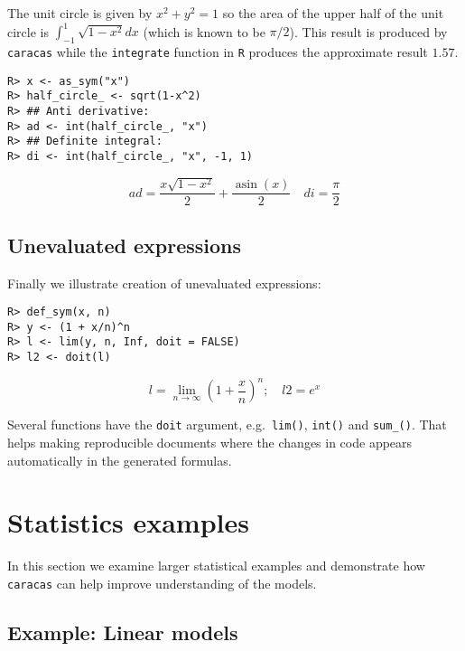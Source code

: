 The unit circle is given by \(x^2 + y^2 = 1\) so the area of the upper
half of the unit circle is \(\int_{-1}^1 \sqrt{1-x^2}dx\) (which is
known to be \(\pi/2\)). This result is produced by \texttt{caracas} while the
\texttt{integrate} function in \texttt{R} produces the approximate result \(1.57\).

\begin{verbatim}
R> x <- as_sym("x")
R> half_circle_ <- sqrt(1-x^2)
R> ## Anti derivative:
R> ad <- int(half_circle_, "x")
R> ## Definite integral:
R> di <- int(half_circle_, "x", -1, 1)
\end{verbatim}

\[
ad = \frac{x \sqrt{1 - x^{2}}}{2} + \frac{\operatorname{asin}{\left(x \right)}}{2} \quad
di = \frac{\pi}{2}
\]

\hypertarget{unevaluated-expressions}{%
\subsection{Unevaluated expressions}\label{unevaluated-expressions}}

Finally we illustrate creation of unevaluated expressions:

\begin{verbatim}
R> def_sym(x, n)
R> y <- (1 + x/n)^n
R> l <- lim(y, n, Inf, doit = FALSE)
R> l2 <- doit(l)
\end{verbatim}

\[
l = \lim_{n \to \infty} \left(1 + \frac{x}{n}\right)^{n}; \quad l2 = e^{x}
\]

Several functions have the \texttt{doit} argument, e.g.~\texttt{lim()}, \texttt{int()} and \texttt{sum\_()}.
That helps making reproducible documents where the changes
in code appears automatically in the generated formulas.

\hypertarget{statistics-examples}{%
\section{Statistics examples}\label{statistics-examples}}

In this section we examine larger statistical examples and
demonstrate how \texttt{caracas} can help improve understanding of the models.

\hypertarget{example-linear-models}{%
\subsection{Example: Linear models}\label{example-linear-models}}

